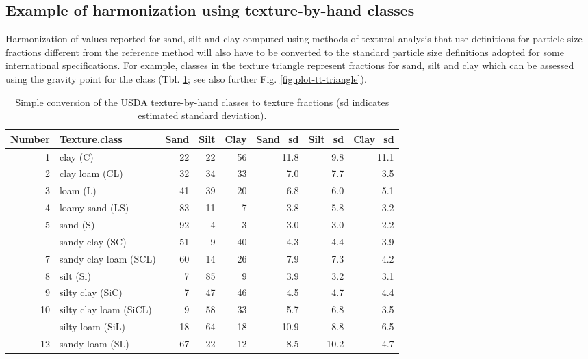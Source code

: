 \documentclass[graybox,natbib,nospthms,UStrade]{svmono}
\begin{document}
\hypertarget{example-of-harmonization-using-texture-by-hand-classes}{%
\subsection{Example of harmonization using texture-by-hand classes}\label{example-of-harmonization-using-texture-by-hand-classes}}

Harmonization of values reported for sand, silt and clay computed using
methods of textural analysis that use definitions for particle size
fractions different from the reference method will also have to be
converted to the standard particle size definitions adopted for some
international specifications. For example, classes in the texture
triangle represent fractions for sand, silt and clay which can be
assessed using the gravity point for the class (Tbl. \ref{tab:usdatexturec}; see also further Fig. \ref{fig:plot-tt-triangle}).

\begin{table}[t]

\caption{\label{tab:usdatexturec}Simple conversion of the USDA texture-by-hand classes to texture fractions (sd indicates estimated standard deviation).}
\centering
\begin{tabular}{rlrrrrrr}
\toprule
Number & Texture.class & Sand & Silt & Clay & Sand\_sd & Silt\_sd & Clay\_sd\\
\midrule
1 & clay (C) & 22 & 22 & 56 & 11.8 & 9.8 & 11.1\\
2 & clay loam (CL) & 32 & 34 & 33 & 7.0 & 7.7 & 3.5\\
3 & loam (L) & 41 & 39 & 20 & 6.8 & 6.0 & 5.1\\
4 & loamy sand (LS) & 83 & 11 & 7 & 3.8 & 5.8 & 3.2\\
5 & sand (S) & 92 & 4 & 3 & 3.0 & 3.0 & 2.2\\
\addlinespace
6 & sandy clay (SC) & 51 & 9 & 40 & 4.3 & 4.4 & 3.9\\
7 & sandy clay loam (SCL) & 60 & 14 & 26 & 7.9 & 7.3 & 4.2\\
8 & silt (Si) & 7 & 85 & 9 & 3.9 & 3.2 & 3.1\\
9 & silty clay (SiC) & 7 & 47 & 46 & 4.5 & 4.7 & 4.4\\
10 & silty clay loam (SiCL) & 9 & 58 & 33 & 5.7 & 6.8 & 3.5\\
\addlinespace
11 & silty loam (SiL) & 18 & 64 & 18 & 10.9 & 8.8 & 6.5\\
12 & sandy loam (SL) & 67 & 22 & 12 & 8.5 & 10.2 & 4.7\\
\bottomrule
\end{tabular}
\end{table}
\end{document}
